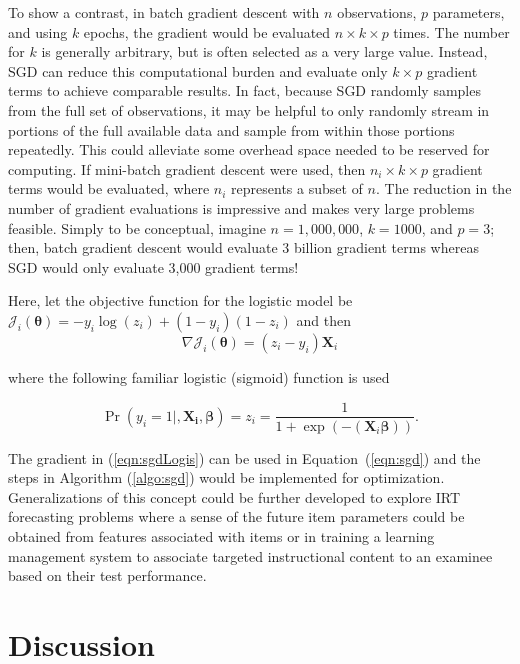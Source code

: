 \documentclass[12pt]{article}
\begin{document}
To show a contrast, in batch gradient descent with $n$ observations, $p$ parameters, and using $k$ epochs, the gradient would be evaluated $n \times k \times p$ times. The number for $k$ is generally arbitrary, but is often selected as a very large value. Instead, SGD can reduce this computational burden and evaluate only $k \times p$ gradient terms to achieve comparable results. In fact, because SGD randomly samples from the full set of observations, it may be helpful to only randomly stream in portions of the full available data and sample from within those portions repeatedly. This could alleviate some overhead space needed to be reserved for computing. If mini-batch gradient descent were used, then $n_i \times k \times p$ gradient terms would be evaluated, where $n_i$ represents a subset of $n$. The reduction in the number of gradient evaluations is impressive and makes very large problems feasible. Simply to be conceptual, imagine $n=1,000,000$, $k=1000$, and $p=3$; then, batch gradient descent would evaluate 3 billion gradient terms whereas SGD would only evaluate 3,000 gradient terms!

Here, let the objective function for the logistic model be $\mathcal{J}_i(\bm{\theta}) = -y_i\log(z_i) + (1 - y_i)(1-z_i)$ and then 
\begin{equation}
\label{eqn:sgdLogis}
\nabla\mathcal{J}_i(\bm{\theta}) = (z_i - y_i)\bm{X}_i
\end{equation}

\noindent where the following familiar logistic (sigmoid) function is used

\begin{equation}
\Pr(y_i=1|,\bm{\bm{X}_i,\beta}) = z_i = \frac{1}{1 + \exp(-(\bm{X}_i\bm{\beta}))}.
\end{equation}

The gradient in (\ref{eqn:sgdLogis}) can be used in Equation~(\ref{eqn:sgd}) and the steps in Algorithm (\ref{algo:sgd}) would be implemented for optimization. Generalizations of this concept could be further developed to explore IRT forecasting problems where a sense of the future item parameters could be obtained from features associated with items or in training a learning management system to associate targeted instructional content to an examinee based on their test performance.   

\section*{Discussion}
\end{document}
